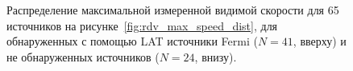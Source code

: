 \begin{figure}[tbh]
 \caption{Распределение максимальной измеренной видимой скорости для 65 источников на
рисунке~\ref{fig:rdv_max_speed_dist}, для обнаруженных с помощью LAT источники Fermi ($N =
41$, вверху) и не обнаруженных источников ($N = 24$, внизу).}
 \label{fig:rdv_speed_gamma}
\end{figure}

